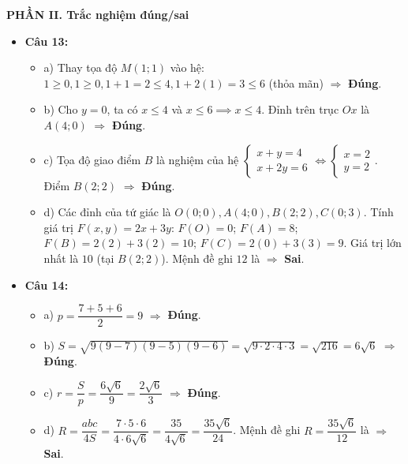 \documentclass[12pt,a4paper]{article}
\begin{document}
\vspace{0.2cm}
\textbf{PHẦN II. Trắc nghiệm đúng/sai}
\begin{itemize}[leftmargin=0.6cm, itemsep=3pt]
    \item \textbf{Câu 13:}
    \begin{itemize}
        \item a) Thay tọa độ $M(1; 1)$ vào hệ: $1 \ge 0, 1 \ge 0, 1+1=2 \le 4, 1+2(1)=3 \le 6$ (thỏa mãn) $\Rightarrow$ \textbf{Đúng}.
        \item b) Cho $y = 0$, ta có $x \le 4$ và $x \le 6 \implies x \le 4$. Đỉnh trên trục $Ox$ là $A(4; 0)$ $\Rightarrow$ \textbf{Đúng}.
        \item c) Tọa độ giao điểm $B$ là nghiệm của hệ $\begin{cases} x + y = 4 \\ x + 2y = 6 \end{cases} \iff \begin{cases} x = 2 \\ y = 2 \end{cases}$. Điểm $B(2; 2)$ $\Rightarrow$ \textbf{Đúng}.
        \item d) Các đỉnh của tứ giác là $O(0; 0), A(4; 0), B(2; 2), C(0; 3)$. Tính giá trị $F(x, y) = 2x + 3y$:
        $F(O) = 0$; $F(A) = 8$; $F(B) = 2(2) + 3(2) = 10$; $F(C) = 2(0) + 3(3) = 9$.
        Giá trị lớn nhất là $10$ (tại $B(2; 2)$). Mệnh đề ghi $12$ là $\Rightarrow$ \textbf{Sai}.
    \end{itemize}

    \item \textbf{Câu 14:}
    \begin{itemize}
        \item a) $p = \dfrac{7 + 5 + 6}{2} = 9$ $\Rightarrow$ \textbf{Đúng}.
        \item b) $S = \sqrt{9(9 - 7)(9 - 5)(9 - 6)} = \sqrt{9 \cdot 2 \cdot 4 \cdot 3} = \sqrt{216} = 6\sqrt{6}$ $\Rightarrow$ \textbf{Đúng}.
        \item c) $r = \dfrac{S}{p} = \dfrac{6\sqrt{6}}{9} = \dfrac{2\sqrt{6}}{3}$ $\Rightarrow$ \textbf{Đúng}.
        \item d) $R = \dfrac{abc}{4S} = \dfrac{7 \cdot 5 \cdot 6}{4 \cdot 6\sqrt{6}} = \dfrac{35}{4\sqrt{6}} = \dfrac{35\sqrt{6}}{24}$. Mệnh đề ghi $R = \dfrac{35\sqrt{6}}{12}$ là $\Rightarrow$ \textbf{Sai}.
    \end{itemize}
\end{itemize}
\end{document}
